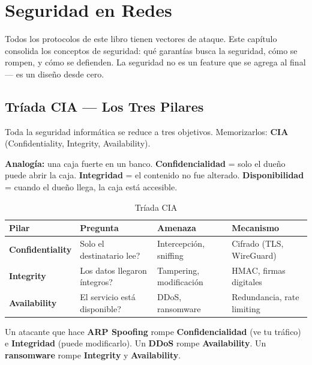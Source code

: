 \chapter{ Seguridad en Redes}

\begin{concepto}
Todos los protocolos de este libro tienen vectores de ataque. Este capítulo
consolida los conceptos de seguridad: qué garantías busca la seguridad,
cómo se rompen, y cómo se defienden. La seguridad no es un feature que
se agrega al final --- es un diseño desde cero.
\end{concepto}

\section{ Tríada CIA --- Los Tres Pilares}

\begin{concepto}
Toda la seguridad informática se reduce a tres objetivos. Memorizarlos:
\textbf{CIA} (Confidentiality, Integrity, Availability).

 \textbf{Analogía:} una caja fuerte en un banco.
\textbf{Confidencialidad} = solo el dueño puede abrir la caja.
\textbf{Integridad} = el contenido no fue alterado.
\textbf{Disponibilidad} = cuando el dueño llega, la caja está accesible.
\end{concepto}

\begin{table}[h!]
\centering
\renewcommand{\arraystretch}{1.5}
\begin{tabular}{llll}
\toprule
\textbf{Pilar} & \textbf{Pregunta} & \textbf{Amenaza} & \textbf{Mecanismo} \\
\midrule
\textbf{Confidentiality} & Solo el destinatario lee? & Intercepción, sniffing & Cifrado (TLS, WireGuard) \\
\textbf{Integrity} & Los datos llegaron íntegros? & Tampering, modificación & HMAC, firmas digitales \\
\textbf{Availability} & El servicio está disponible? & DDoS, ransomware & Redundancia, rate limiting \\
\bottomrule
\end{tabular}
\caption{Tríada CIA}
\end{table}

\begin{ejemplo}
Un atacante que hace \textbf{ARP Spoofing} rompe \textbf{Confidencialidad}
(ve tu tráfico) e \textbf{Integridad} (puede modificarlo).
Un \textbf{DDoS} rompe \textbf{Availability}.
Un \textbf{ransomware} rompe \textbf{Integrity} y \textbf{Availability}.
\end{ejemplo}

